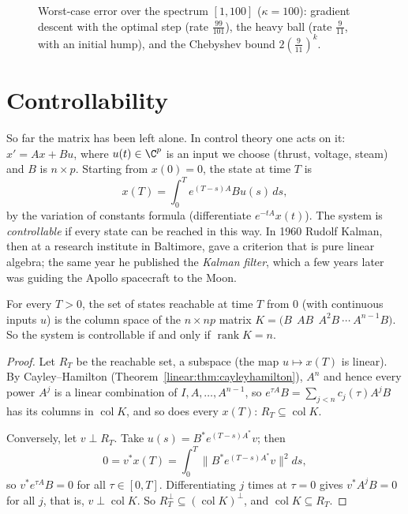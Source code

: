 \begin{figure}[ht]
\centering
{}
\caption{Worst-case error over the spectrum $[1,100]$ ($\kappa=100$): gradient descent with the optimal step (rate $\frac{99}{101}$), the
heavy ball (rate $\frac9{11}$, with an initial hump), and the Chebyshev bound $2(\frac9{11})^k$.}
\label{linear:fig:rates}
\end{figure}

\section{Controllability}

So far the matrix has been left alone. In control theory one acts on it: $x'=Ax+Bu$, where $u(t)\in\C^p$ is an input we choose (thrust,
voltage, steam) and $B$ is $n\times p$. Starting from $x(0)=0$, the state at time $T$ is
\[
x(T)=\int_0^Te^{(T-s)A}Bu(s)\,ds,
\]
by the variation of constants formula (differentiate $e^{-tA}x(t)$). The system is \emph{controllable} if every state can be reached
in this way. In 1960 Rudolf Kalman, then at a research institute in Baltimore, gave a criterion that is pure linear algebra; the same
year he published the \emph{Kalman filter}, which a few years later was guiding the Apollo spacecraft to the Moon.

\begin{theorem}\label{linear:thm:kalman}
For every $T>0$, the set of states reachable at time $T$ from $0$ (with continuous inputs $u$) is the column space of the
$n\times np$ matrix $K=\bigl(B\ \ AB\ \ A^2B\ \cdots\ A^{n-1}B\bigr)$. So the system is controllable if and only if $\operatorname{rank}K=n$.
\end{theorem}
\begin{proof}
Let $R_T$ be the reachable set, a subspace (the map $u\mapsto x(T)$ is linear). By Cayley--Hamilton (Theorem~\ref{linear:thm:cayleyhamilton}),
$A^n$ and hence every power $A^j$ is a linear combination of $I,A,\dots,A^{n-1}$, so $e^{\tau A}B=\sum_{j<n}c_j(\tau)A^jB$ has its columns in
$\operatorname{col}K$, and so does every $x(T)$: $R_T\subseteq\operatorname{col}K$.

Conversely, let $v\perp R_T$. Take $u(s)=B^*e^{(T-s)A^*}v$; then
\[
0=v^*x(T)=\int_0^T\bigl\|B^*e^{(T-s)A^*}v\bigr\|^2ds,
\]
so $v^*e^{\tau A}B=0$ for all $\tau\in[0,T]$. Differentiating $j$ times at $\tau=0$ gives $v^*A^jB=0$ for all $j$, that is, $v\perp\operatorname{col}K$. So
$R_T^\perp\subseteq(\operatorname{col}K)^\perp$, and $\operatorname{col}K\subseteq R_T$.
\end{proof}

